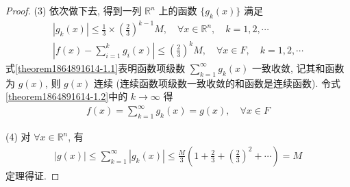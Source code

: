 \documentclass[../../main.tex]{subfiles}
\begin{document}
\begin{proof}
(3) 依次做下去, 得到一列 $\mathbb{R}^n$ 上的函数 $\{g_k(x)\}$ 满足
\begin{gather}
|g_k(x)| \leqslant \frac{1}{3} \times \left(\frac{2}{3}\right)^{k - 1} M, \quad \forall x \in \mathbb{R}^n, \quad k = 1, 2, \cdots
\label{theorem1864891614-1.1}
\\
\left|f(x) - \sum_{i = 1}^{k} g_i(x)\right| \leqslant \left(\frac{2}{3}\right)^k M, \quad \forall x \in F, \quad k = 1, 2, \cdots
\label{theorem1864891614-1.2}
\end{gather}
式\eqref{theorem1864891614-1.1}表明函数项级数 $\sum_{k = 1}^{\infty} g_k(x)$ 一致收敛, 记其和函数为 $g(x)$, 则 $g(x)$ 连续 (连续函数项级数一致收敛的和函数是连续函数). 令式 \eqref{theorem1864891614-1.2}中的 $k \to \infty$ 得
\begin{align*}
f(x) = \sum_{k = 1}^{\infty} g_k(x) = g(x), \quad \forall x \in F
\end{align*}

(4) 对 $\forall x \in \mathbb{R}^n$, 有
\begin{align*}
|g(x)| \leqslant \sum_{k = 1}^{\infty}|g_k(x)| \leqslant \frac{M}{3}\left(1 + \frac{2}{3} + \left(\frac{2}{3}\right)^2 + \cdots\right) = M
\end{align*}
定理得证.

\end{proof}
\end{document}

